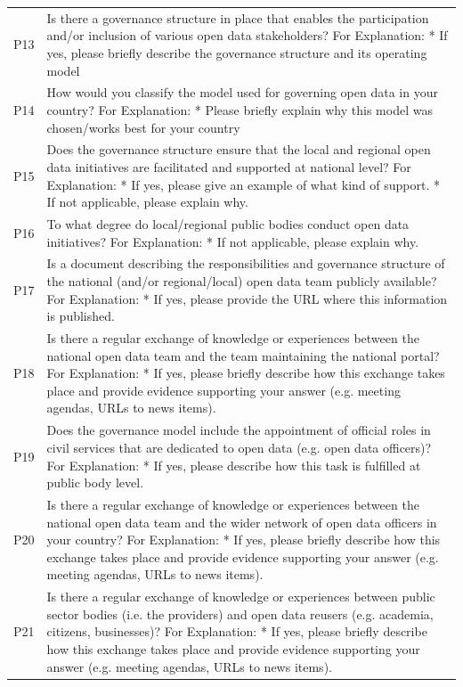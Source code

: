 {\begin{longtable}[]{@{}
  L{0.1386}
  L{0.8614}@{}}
P13 & Is there a governance structure in place that enables the participation and/or inclusion of various open data stakeholders? For Explanation: * If yes, please briefly describe the governance structure and its operating model \\
P14 & How would you classify the model used for governing open data in your country? For Explanation: * Please briefly explain why this model was chosen/works best for your country \\
P15 & Does the governance structure ensure that the local and regional open data initiatives are facilitated and supported at national level? For Explanation: * If yes, please give an example of what kind of support. * If not applicable, please explain why. \\
P16 & To what degree do local/regional public bodies conduct open data initiatives? For Explanation: * If not applicable, please explain why. \\
P17 & Is a document describing the responsibilities and governance structure of the national (and/or regional/local) open data team publicly available? For Explanation: * If yes, please provide the URL where this information is published. \\
P18 & Is there a regular exchange of knowledge or experiences between the national open data team and the team maintaining the national portal? For Explanation: * If yes, please briefly describe how this exchange takes place and provide evidence supporting your answer (e.g. meeting agendas, URLs to news items). \\
P19 & Does the governance model include the appointment of official roles in civil services that are dedicated to open data (e.g. open data officers)? For Explanation: * If yes, please describe how this task is fulfilled at public body level. \\
P20 & Is there a regular exchange of knowledge or experiences between the national open data team and the wider network of open data officers in your country? For Explanation: * If yes, please briefly describe how this exchange takes place and provide evidence supporting your answer (e.g. meeting agendas, URLs to news items). \\
P21 & Is there a regular exchange of knowledge or experiences between public sector bodies (i.e. the providers) and open data reusers (e.g. academia, citizens, businesses)? For Explanation: * If yes, please briefly describe how this exchange takes place and provide evidence supporting your answer (e.g. meeting agendas, URLs to news items). \\

\end{longtable}}
